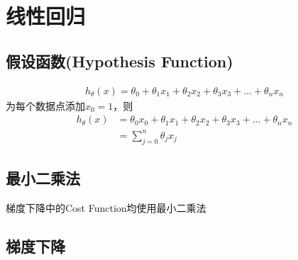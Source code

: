 \section{线性回归}
\subsection{假设函数(Hypothesis Function)}
\begin{equation}\begin{aligned}
	h_\theta(x) = \theta_0 + \theta_1x_1 + \theta_2x_2 + \theta_3x_3 + ... + \theta_nx_n
\end{aligned}\end{equation}
为每个数据点添加$x_0=1$，则
\begin{equation}\begin{aligned}
	h_\theta(x) &= \theta_0x_0 + \theta_1x_1 + \theta_2x_2 + \theta_3x_3 + ... + \theta_nx_n \\
	&= \sum_{j=0}^n{\theta_jx_j}
\end{aligned}\end{equation}

\subsection{最小二乘法}
梯度下降中的Cost Function均使用最小二乘法

\subsection{梯度下降}
